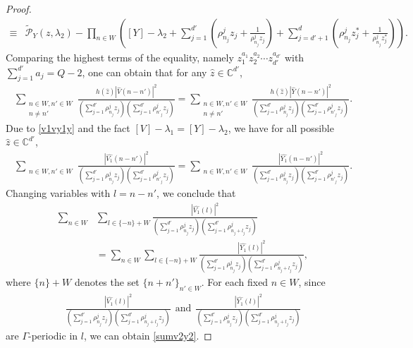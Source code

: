 \documentclass[12pt,letterpaper]{amsart}
\def\C{{\mathbb C}}
\begin{document}
\begin{proof}
\begin{align}
\equiv &\tilde{\mathcal{P}}_Y(z,\lambda_2)-\prod_{n\in W}\left([Y]-\lambda_2+\sum_{j=1}^{d'}\left(\rho^j_{n_j}z_j+\frac{1}{\rho^j_{n_j}z_j}\right)+\sum_{j=d'+1}^{d}\left(\rho^j_{n_j}z_j^*+\frac{1}{\rho^j_{n_j}z_j^*}\right)\right).\nonumber
\end{align}
Comparing the highest terms of the equality, namely $z_1^{a_1}z_2^{a_2}\cdots z_{d'}^{a_{d'}}$ with $\sum_{j=1}^{d'}a_j= Q-2$, one can obtain that for any $\hat{z}\in\mathbb{C}^{d'}$,
\begin{align}
\sum_{\substack{n \in W, n' \in W \\ n \neq n'}} \frac{h(\hat{z}) \left| \hat{V}(n - n') \right|^2}{\left(\sum_{j=1}^{d'}\rho^j_{n_j}z_j\right)\left(\sum_{j=1}^{d'}\rho^j_{n'_j}z_j\right)} = \sum_{\substack{n \in W, n' \in W \\ n \neq n'}} \frac{h(\hat{z}) \left| \hat{Y}(n - n') \right|^2}{\left(\sum_{j=1}^{d'}\rho^j_{n_j}z_j\right)\left(\sum_{j=1}^{d'}\rho^j_{n'_j}z_j\right)}.\nonumber
\end{align}
Due to \eqref{v1vy1y} and the fact $[V]-\lambda_1=[Y]-\lambda_2$, we have for all possible $\hat{z}\in \C^{d'}$,
\begin{align}
\sum_{\substack{n \in W, n' \in W}} \frac{\left| \hat{V_1}(n - n') \right|^2}{\left(\sum_{j=1}^{d'}\rho^j_{n_j}z_j\right)\left(\sum_{j=1}^{d'}\rho^j_{n'_j}z_j\right)} = \sum_{\substack{n \in W, n' \in W}} \frac{\left| \hat{Y_1}(n - n') \right|^2}{\left(\sum_{j=1}^{d'}\rho^j_{n_j}z_j\right)\left(\sum_{j=1}^{d'}\rho^j_{n'_j}z_j\right)}.\nonumber
\end{align}
Changing variables with $l=n-n'$, we conclude that
\begin{align}
\sum_{n\in W}&\sum_{l\in\{-n\}+W}\frac{\left|{\hat{V_1}(l)}\right|^2}{\left(\sum_{j=1}^{d'}\rho^j_{n_j}z_j\right)\left(\sum_{j=1}^{d'}\rho^j_{n_j+l_j}z_j\right)}\nonumber\\
&=\sum_{n\in W}\sum_{l\in\{-n\}+W}\frac{\left|{\hat{Y_1}(l)}\right|^2}{\left(\sum_{j=1}^{d'}\rho^j_{n_j}z_j\right)\left(\sum_{j=1}^{d'}\rho^j_{n_j+l_j}z_j\right)},\nonumber
\end{align}
where $\{n\}+W$ denotes the set $\{n+n'\}_{n'\in W}$. For each fixed $n\in W$, since
\begin{align}
\frac{\left|{\hat{V_1}(l)}\right|^2}{\left(\sum_{j=1}^{d'}\rho^j_{n_j}z_j\right)\left(\sum_{j=1}^{d'}\rho^j_{n_j+l_j}z_j\right)}\ \ \mathrm{and}\ \ \frac{\left|{\hat{Y_1}(l)}\right|^2}{\left(\sum_{j=1}^{d'}\rho^j_{n_j}z_j\right)\left(\sum_{j=1}^{d'}\rho^j_{n_j+l_j}z_j\right)}\nonumber
\end{align}
are $\Gamma$-periodic in $l$,  we can obtain \eqref{sumv2y2}.
\end{proof}
\end{document}
